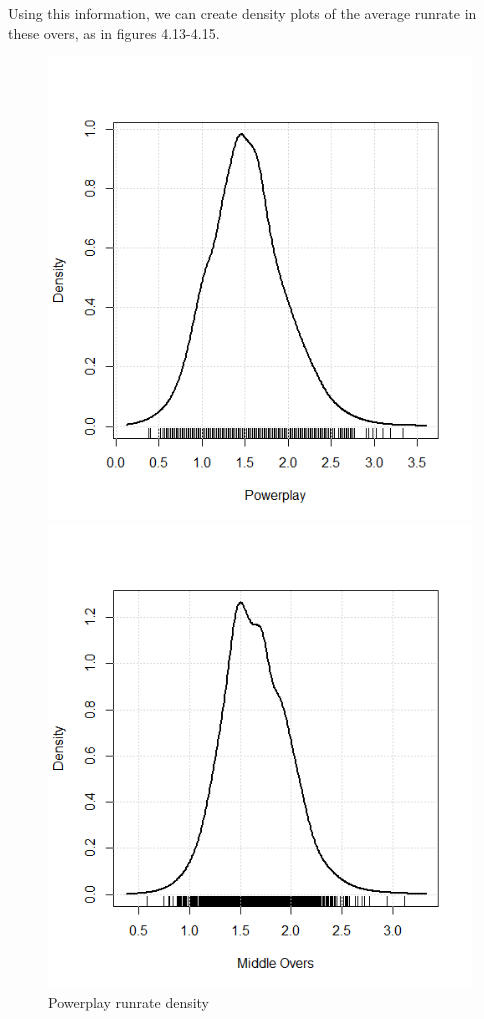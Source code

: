 Using this information, we can create density plots of the average runrate in these overs, as in figures 4.13-4.15. 

\begin{figure}[h]
      \includegraphics[width=\linewidth]{figures/powerplaydens.png}
      \caption{Powerplay runrate density}
    \endminipage\hfill
      \includegraphics[width=\linewidth]{figures/middleoversdens.png}

\end{figure}
